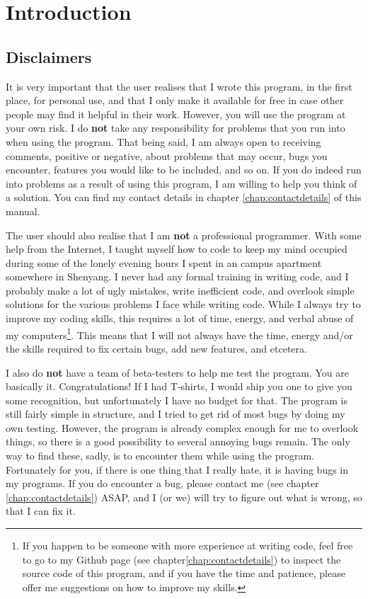 \documentclass{memoir}
\begin{document}
\chapter{Introduction}
\label{chap:introduction}

\section{Disclaimers}
\label{sec:disclaimers}

It is very important that the user realises that I wrote this program, in the first place, for personal use, and that I only make it available for free in case other people may find it helpful in their work. However, you will use the program at your own risk. I do \textbf{not} take any responsibility for problems that you run into when using the program. That being said, I am always open to receiving comments, positive or negative, about problems that may occur, bugs you encounter, features you would like to be included, and so on. If you do indeed run into problems as a result of using this program, I am willing to help you think of a solution. You can find my contact details in chapter \ref{chap:contactdetails} of this manual.

The user should also realise that I am \textbf{not} a professional programmer. With some help from the Internet, I taught myself how to code to keep my mind occupied during some of the lonely evening hours I spent in an campus apartment somewhere in Shenyang. I never had any formal training in writing code, and I probably make a lot of ugly mistakes, write inefficient code, and overlook simple solutions for the various problems I face while writing code. While I always try to improve my coding skills, this requires a lot of time, energy, and verbal abuse of my computers\footnote{If you happen to be someone with more experience at writing code, feel free to go to my Github page (see chapter\ref{chap:contactdetails}) to inspect the source code of this program, and if you have the time and patience, please offer me suggestions on how to improve my skills.}. This means that I will not always have the time, energy and/or the skills required to fix certain bugs, add new features, and etcetera.

I also do \textbf{not} have a team of beta-testers to help me test the program. You are basically it. Congratulations! If I had T-shirts, I would ship you one to give you some recognition, but unfortunately I have no budget for that. The program is still fairly simple in structure, and I tried to get rid of most bugs by doing my own testing. However, the program is already complex enough for me to overlook things, so there is a good possibility to several annoying bugs remain. The only way to find these, sadly, is to encounter them while using the program. Fortunately for you, if there is one thing that I really hate, it is having bugs in my programs. If you do encounter a bug, please contact me (see chapter \ref{chap:contactdetails}) ASAP, and I (or we) will try to figure out what is wrong, so that I can fix it.
\end{document}
